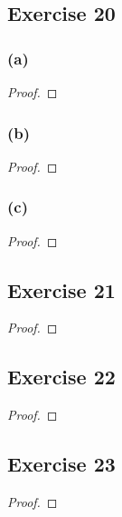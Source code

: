 \documentclass[14pt]{extarticle}
\begin{document}
\subsection{Exercise 20}

\subsubsection{(a)}

\begin{proof}

\end{proof}

\subsubsection{(b)}

\begin{proof}

\end{proof}

\subsubsection{(c)}

\begin{proof}

\end{proof}

\subsection{Exercise 21}

\begin{proof}

\end{proof}

\subsection{Exercise 22}

\begin{proof}

\end{proof}

\subsection{Exercise 23}

\begin{proof}

\end{proof}
\end{document}
